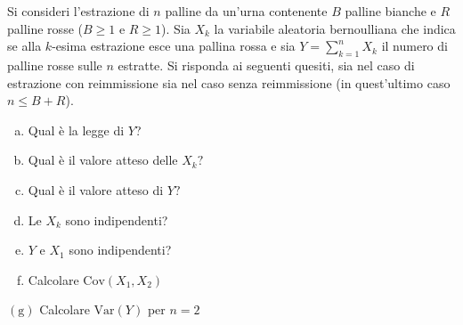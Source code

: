 Si consideri l'estrazione di $n$ palline da un'urna contenente $B$ palline bianche e $R$ palline rosse ($B\geq 1$ e $R\geq 1$). Sia $X_{k}$ la variabile aleatoria bernoulliana che indica se alla $k$-esima estrazione esce una pallina rossa e sia $Y=\sum_{k=1}^{n} X_{k}$ il numero di palline rosse sulle $n$ estratte. Si risponda ai seguenti quesiti, sia nel caso di estrazione con reimmissione sia nel caso senza reimmissione (in quest'ultimo caso $n\leq B+R$).
\begin{enumerate}[a)]
	\item Qual è la legge di $Y$?
	\item Qual è il valore atteso delle $X_{k} ?$
	\item Qual è il valore atteso di $Y?$
	\item Le $X_{k}$ sono indipendenti?
	\item $Y$ e $X_{1}$ sono indipendenti?
	\item Calcolare $\mathrm{Cov}(X_{1} ,X_{2})$
\end{enumerate}
$(\mathrm{g})$ Calcolare $\mathrm{Var} (Y)$ per $n=2$

\Esercizio{}

